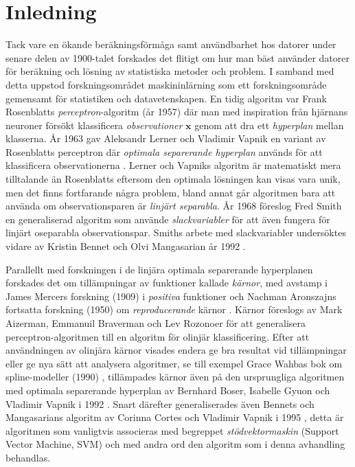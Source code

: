 \documentclass[a4paper, 12pt]{report}
\theoremstyle{definition}
\theoremstyle{remark}
\begin{document}
\chapter{Inledning}
Tack vare en ökande beräkningsförmåga samt användbarhet hos datorer under senare delen av 1900-talet forskades det flitigt om hur man bäst använder datorer för beräkning och lösning av statistiska metoder och problem.
I samband med detta uppstod forskningsområdet maskininlärning som ett forskningsområde gemensamt för statistiken och datavetenskapen.
En tidig algoritm var Frank Rosenblatts \emph{perceptron}-algoritm (år 1957) \cite{Rosenblatt} där man med inspiration från hjärnans neuroner försökt klassificera \emph{observationer} $\mathbf{x}$ genom att dra ett \emph{hyperplan} mellan klasserna.
År 1963 gav Aleksandr Lerner och Vladimir Vapnik en variant av Rosenblatts perceptron där \emph{optimala separerande hyperplan} används för att klassificera observationerna \cite{VapnikLerner1963}.
Lerner och Vapniks algoritm är matematiskt mera tilltalande än Rosenblatts eftersom den optimala lösningen kan visas vara unik, men det finns fortfarande några problem, bland annat går algoritmen bara att använda om observationsparen är \emph{linjärt separabla}.
År 1968 föreslog Fred Smith \cite{Smith} en generaliserad algoritm som använde \emph{slackvariabler} för att även fungera för linjärt oseparabla observationspar.
Smiths arbete med slackvariabler undersöktes vidare av Kristin Bennet och Olvi Mangasarian år 1992 \cite{BennetMangasarian}.

Parallellt med forskningen i de linjära optimala separerande hyperplanen forskades det om tillämpningar av funktioner kallade \emph{kärnor}, med avstamp i James Mercers forskning (1909) i \emph{positiva} funktioner \cite{Mercer} och Nachman Aronszajns fortsatta forskning (1950) om \emph{reproducerande} kärnor \cite{Aronszajn}.
Kärnor föreslogs av Mark Aizerman, Emmanuil Braverman och Lev Rozonoer \cite{Aizerman} för att generalisera perceptron-algoritmen till en algoritm för olinjär klassificering.
Efter att användningen av olinjära kärnor visades endera ge bra resultat vid tillämpningar eller ge nya sätt att analysera algoritmer, se till exempel Grace Wahbas bok om spline-modeller (1990) \cite{Grace}, tillämpades kärnor även på den ursprungliga algoritmen med optimala separerande hyperplan av Bernhard Boser, Isabelle Gyuon och Vladimir Vapnik i 1992 \cite{BoserGyuonVapnik}.
Snart därefter generaliserades även Bennets och Mangasarians algoritm av Corinna Cortes och Vladimir Vapnik i 1995 \cite{CortesVapnik}, detta är algoritmen som vanligtvis associeras med begreppet \emph{stödvektormaskin} (Support Vector Machine, SVM) och med andra ord den algoritm som i denna avhandling behandlas.
\end{document}
